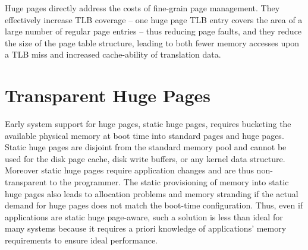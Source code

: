 Huge pages directly address the costs of fine-grain page management.
They effectively increase TLB coverage -- one huge page TLB entry covers the area
of a large number of regular page entries -- thus reducing page faults, and they
reduce the size of the page table structure, leading to both fewer memory
accesses upon a TLB miss and increased cache-ability of translation data.
%
%

\section{Transparent Huge Pages} \label{sec:thp_bg}
Early system support for huge pages, static huge pages, requires bucketing the
available physical memory at boot time into standard pages and huge pages.
Static huge pages are disjoint from the standard memory pool and cannot be used
for the disk page cache, disk write buffers, or any kernel data structure.
Moreover static huge pages require application changes and are thus
non-transparent to the programmer. The static provisioning of memory into static
huge pages also leads to allocation problems and memory stranding if the actual
demand for huge pages does not match the boot-time configuration.  Thus, even if
applications are static huge page-aware, such a solution is less than ideal for
many systems because it requires a priori knowledge of applications' memory
requirements to ensure ideal performance.

